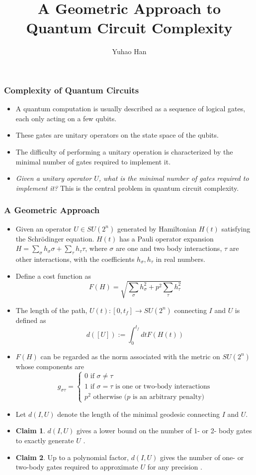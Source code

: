 \documentclass[aspectratio=169]{beamer}
\title[A Geometric Approach to Quantum Circuit Complexity] %
{A Geometric Approach to Quantum Circuit Complexity} %
\author{Yuhao Han}
\institute{Mathematical Institute\\University of Oxford}
\date[\today]  %
{} %
\begin{document}
\begin{frame}[plain]
  \titlepage
\end{frame}


\begin{frame}
	\frametitle{Complexity of Quantum Circuits}

	\begin{itemize}
		\item A quantum computation is usually described as a sequence of logical gates, each only acting on a few qubits.
		\item These gates are unitary operators on the state space of the qubits.
		\item The difficulty of performing a unitary operation is characterized by the minimal number of gates required to implement it.
		\item \emph{Given a unitary operator $U$, what is the minimal number of gates required to implement it?} This is the central problem in quantum circuit complexity.
	\end{itemize}
\end{frame}

\begin{frame}[allowframebreaks]
	\frametitle{A Geometric Approach \citep{Nielsen2006}}

\begin{itemize}
		\item Given an operator $U \in SU(2^n)$ generated by Hamiltonian $H(t)$ satisfying the Schrödinger equation.
			$H(t)$ has a Pauli operator expansion $H = \sum_{\sigma}h_{\sigma}\sigma + \sum_{\tau}h_{\tau}\tau$, where $\sigma$ are one and two body interactions, $\tau$ are other interactions, with the coefficients $h_{\sigma}, h_{\tau} $ in real numbers.
		\item  Define a cost function as
$$
F(H) = \sqrt{\sum_{\sigma} h_{\sigma}^2 + p^2\sum_{\tau}h_{\tau}^2}
$$
\item The length of the path, $U(t): [0, t_f] \rightarrow SU(2^n)$ connecting $I$ and $U$ is defined as 
$$
d([U]) := \int_0^{t_f} dt F(H(t))
$$
\item $F(H)$ can be regarded as the norm associated with the metric on $SU(2^n)$ whose components are
$$
	g_{\sigma \tau} = \begin{cases}
		0 \text{ if } \sigma \neq \tau \\
		1 \text{ if } \sigma  = \tau \text{ is one or two-body interactions} \\
		p^2 \text{ otherwise ($p$ is an arbitrary penalty)}
	\end{cases}
$$
\item Let $d(I, U)$ denote the length of the minimal geodesic connecting $I$ and $U$. 
\item \textbf{Claim 1}. $d(I, U)$ gives a lower bound on the number of 1- or 2- body gates to exactly generate $U$ \citep{nielsen2005}.	
\item \textbf{Claim 2}. Up to a polynomial factor, $d(I, U)$ gives the number of one- or two-body gates required to approximate $U$ for any precision \citep{Nielsen2006}.
\end{itemize}
\end{frame}
\end{document}
